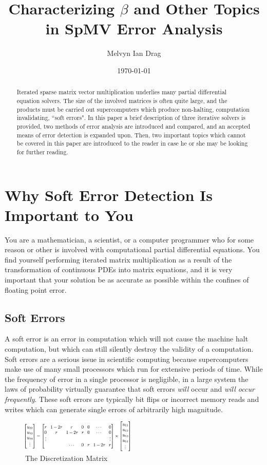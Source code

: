 \documentclass[a4paper]{article}
\title{Characterizing $\beta$ and Other Topics in SpMV Error Analysis}
\author{Melvyn Ian Drag}
\date{\today}
\begin{document}
\maketitle

\begin{abstract}
Iterated sparse matrix vector multiplication underlies many partial differential equation solvers. The size of the involved matrices is often quite large, and the products must be carried out supercomputers which produce non-halting, computation invalidating, ``soft errors". In this paper a brief description of three iterative solvers is provided, two methods of error analysis are introduced and compared, and an accepted means of error detection is expanded upon. Then, two important topics which cannot be covered in this paper are introduced to the reader in case he or she may be looking for further reading.
\end{abstract}


\section{Why Soft Error Detection Is Important to You}
You are a mathematician, a scientist, or a computer programmer who for some reason or other is involved with computational partial differential equations. You find yourself performing iterated matrix multiplication as a result of the transformation of continuous PDEs into matrix equations, and it is very important that your solution be as accurate as possible within the confines of floating point error.
\subsection{Soft Errors}
A soft error is an error in computation which will not cause the machine halt computation, but which can still silently destroy the validity of a computation. Soft errors are a serious issue in scientific computing because supercomputers make use of many small processors which run for extensive periods of time. While the frequency of error in a single processor is negligible, in a large system the laws of probability virtually guarantee that soft errors \emph{will} occur and \emph{will occur frequently}. These soft errors are typically bit flips or incorrect memory reads and writes which can generate single errors of arbitrarily high magnitude.
\begin{figure}
  \begin{center}
    \includegraphics[width=0.48\textwidth]{heat_matrix.png}
  \end{center}
  \caption{The Discretization Matrix}
\end{figure}
\end{document}
